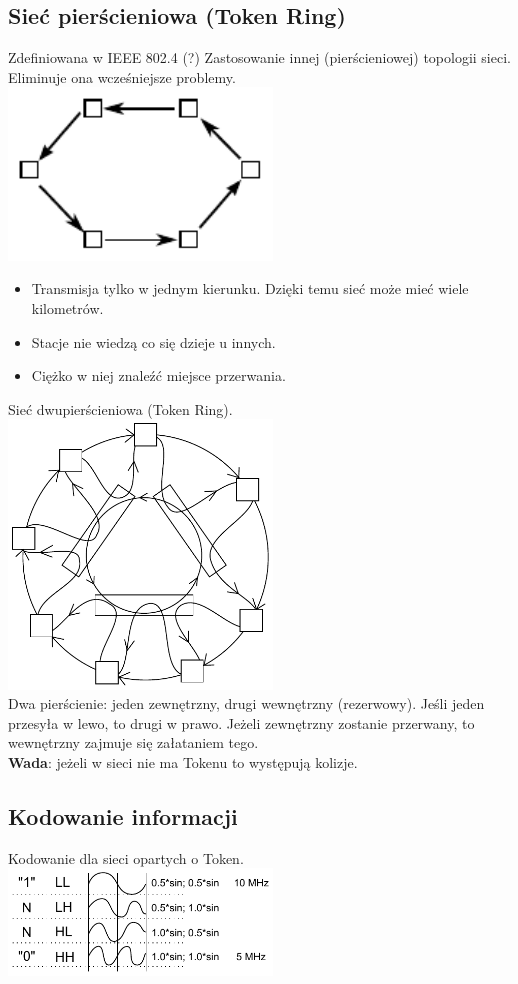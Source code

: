 \documentclass[a4paper,twoside]{article}
\begin{document}
		\subsection{Sieć pierścieniowa (Token Ring)}
			Zdefiniowana w IEEE 802.4 (?)
			Zastosowanie innej (pierścieniowej) topologii sieci. Eliminuje ona wcześniejsze problemy.\\
			\includegraphics[width=7cm]{./images/image29.pdf}
			\begin{itemize}
				\item Transmisja tylko w jednym kierunku. Dzięki temu sieć może mieć wiele kilometrów.
				\item Stacje nie wiedzą co się dzieje u innych.
				\item Ciężko w niej znaleźć miejsce przerwania.
			\end{itemize}
			Sieć dwupierścieniowa (Token Ring).\\
			\includegraphics[width=7cm]{./images/image30.pdf}\\
			Dwa pierścienie: jeden zewnętrzny, drugi wewnętrzny (rezerwowy). Jeśli jeden przesyła w lewo, to drugi w prawo. Jeżeli zewnętrzny zostanie przerwany, to wewnętrzny zajmuje się załataniem tego.\\
			\textbf{Wada}: jeżeli w sieci nie ma Tokenu to występują kolizje.
		\subsection{Kodowanie informacji}
			Kodowanie dla sieci opartych o Token.\\
			\includegraphics[width=7cm]{./images/image31.pdf}\\
\end{document}
